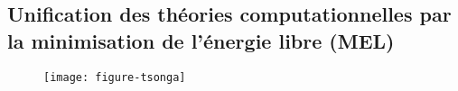 %
\subsection{Unification des théories computationnelles par la minimisation de l'énergie libre (MEL)~\citep{PerrinetAdamsFriston14} }
\label{sec:free}
\begin{figure}%
\begin{center}
   \texttt{[image: figure-tsonga]}%
\end{center}%
\caption{%
}
\end{figure}
